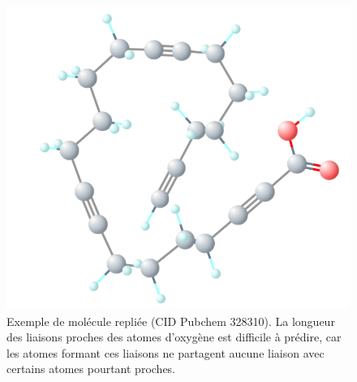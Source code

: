 \begin{figure}[!h]
	\centering
	
	\includegraphics[scale=0.32]{images/mol_repliee.png}
	\caption{Exemple de molécule repliée (CID Pubchem 328310). La longueur des liaisons proches des atomes d'oxygène est difficile à prédire, car les atomes formant ces liaisons ne partagent aucune liaison avec certains atomes pourtant proches.}
	\label{frepliee}
\end{figure}